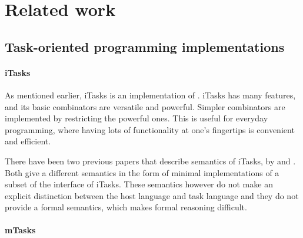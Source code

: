 


\section{Related work}
\label{sec:relatedwork}



\subsection{Task-oriented programming implementations}

\paragraph{iTasks}

As mentioned earlier, iTasks is an implementation of \TOP. iTasks has many
features, and its basic combinators are versatile and powerful. Simpler
combinators are implemented by restricting the powerful ones. This is useful for
everyday programming, where having lots of functionality at one's fingertips is
convenient and efficient.

There have been two previous papers that describe semantics of iTasks, by
\citet{conf/ifl/KoopmanPA08} and \citet{conf/ppdp/PlasmeijerLMAK12}.
Both give a different semantics in the form of minimal implementations of a
subset of the interface of iTasks. These semantics however do not make an
explicit distinction between the host language and task language and they do not
provide a formal semantics, which makes formal reasoning difficult.

\paragraph{mTasks}

